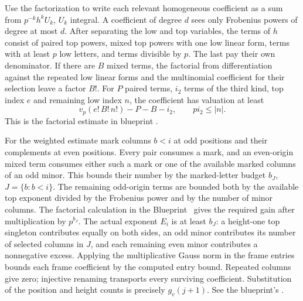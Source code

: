 \begin{outline}
Use the factorization to write each relevant homogeneous coefficient as a sum from \(p^{-k}h^k U_k\), \(U_k\) integral. A coefficient of degree \(d\) sees only Frobenius powers of degree at most \(d\). After separating the low and top variables, the terms of \(h\) consist of paired top powers, mixed top powers with one low linear form, terms with at least \(p\) low letters, and terms divisible by \(p\). The last pay their own denominator. If there are \(B\) mixed terms, the factorial from differentiation against the repeated low linear forms and the multinomial coefficient for their selection leave a factor \(B!\). For \(P\) paired terms, \(i_2\) terms of the third kind, top index \(e\) and remaining low index \(n\), the coefficient has valuation at least
\[
 v_p(e!\,B!\,n!)-P-B-i_2,\qquad p i_2\le |n|.
\]
This is the factorial estimate in blueprint .

For the weighted estimate mark columns \(b<i\) at odd positions and their complements at even positions. Every pair consumes a mark, and an even-origin mixed term consumes either such a mark or one of the available marked columns of an odd minor. This bounds their number by the marked-letter budget \(b_J\), \(J=\{b:b<i\}\). The remaining odd-origin terms are bounded both by the available top exponent divided by the Frobenius power and by the number of minor columns. The factorial calculation in the Blueprint~ gives the required gain after multiplication by \(p^{b_J}\). The actual exponent \(E_i\) is at least \(b_J\): a height-one top singleton contributes equally on both sides, an odd minor contributes its number of selected columns in \(J\), and each remaining even minor contributes a nonnegative excess. Applying the multiplicative Gauss norm in the frame entries bounds each frame coefficient by the computed entry bound. Repeated columns give zero; injective renaming transports every surviving coefficient. Substitution of the position and height counts is precisely \(g_v(j+1)\). See the blueprint's .
\end{outline}
